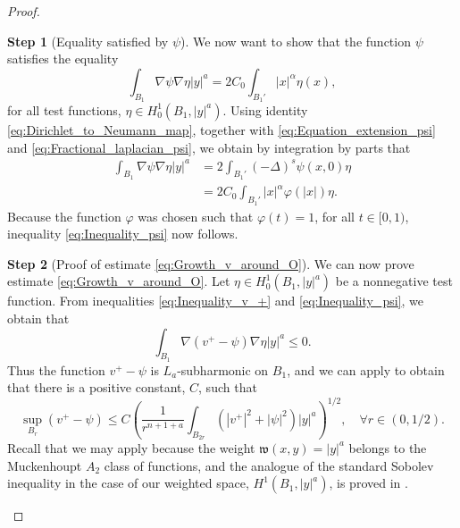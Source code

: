 \documentclass[11pt,reqno]{amsart}
\theoremstyle{definition}
\newtheorem{step}{Step}
\theoremstyle{remark}
\begin{document}
\begin{proof}
\begin{step}[Equality satisfied by $\psi$]
\label{step:Inequality_psi}
We now want to show that the function $\psi$ satisfies the equality
\begin{equation}
\label{eq:Inequality_psi}
\int_{B_1} \nabla \psi\nabla\eta|y|^a = 2C_0 \int_{B_1'} |x|^{\alpha}\eta(x),
\end{equation}
for all test functions, $\eta\in H^1_0(B_1,|y|^a)$. Using identity \eqref{eq:Dirichlet_to_Neumann_map}, together with \eqref{eq:Equation_extension_psi} and \eqref{eq:Fractional_laplacian_psi}, we obtain by integration by parts that
\begin{align*}
\int_{B_1} \nabla \psi\nabla\eta |y|^a &= 2\int_{B_1'} (-\Delta)^s\psi(x,0) \eta\\
&= 2C_0\int_{B_1'} |x|^{\alpha} \varphi(|x|)\eta.
\end{align*}
Because the function $\varphi$ was chosen such that $\varphi(t)=1$, for all $t\in[0,1)$, inequality \eqref{eq:Inequality_psi} now follows.
\end{step}

\begin{step}[Proof of estimate \eqref{eq:Growth_v_around_O}]
We can now prove estimate \eqref{eq:Growth_v_around_O}. Let $\eta\in H^1_0(B_1,|y|^a)$ be a nonnegative test function. From inequalities \eqref{eq:Inequality_v_+} and \eqref{eq:Inequality_psi}, we obtain that
$$
\int_{B_1} \nabla \left(v^+-\psi\right)\nabla\eta|y|^a \leq 0.
$$
Thus the function $v^+-\psi$ is $L_a$-subharmonic on $B_1$, and we can apply \cite[Theorem 2.3.1]{Fabes_Kenig_Serapioni_1982a} to obtain that there is a positive constant, $C$, such that
\begin{equation}
\label{eq:Supremum_estimate_difference_1}
\sup_{B_r} (v^+-\psi) \leq C \left(\frac{1}{r^{n+1+a}}\int_{B_{2r}}\left(|v^+|^2+|\psi|^2\right)|y|^a\right)^{1/2}, \quad\forall r\in (0,1/2).
\end{equation}
Recall that we may apply \cite[Theorem 2.3.1]{Fabes_Kenig_Serapioni_1982a} because the weight ${{\mathfrak{w}}}(x,y)=|y|^a$ belongs to the Muckenhoupt $A_2$ class of functions, and the analogue of the standard Sobolev inequality \cite[Inequality (7.26)]{GilbargTrudinger} in the case of our weighted space, $H^1(B_1,|y|^a)$, is proved in \cite[Theorem (1.6)]{Fabes_Kenig_Serapioni_1982a}.


\end{step}
\end{proof}
\end{document}
